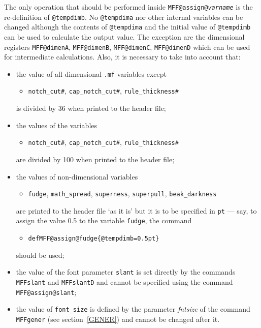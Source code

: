 The only operation that should be performed inside
{\tt\bs{}MFF@assign@{\em varname}} is the re-definition of
{\tt\bs{}@tempdimb}. No {\tt\bs{}@tempdima} nor other
internal variables can be changed although the contents of
{\tt\bs{}@tempdima} and the initial value of {\tt\bs{}@tempdimb}
can be used to calculate the output value. The exception are
the dimensional registers
{\tt\bs{}MFF@dimenA}, {\tt\bs{}MFF@dimenB},
{\tt\bs{}MFF@dimenC}, {\tt\bs{}MFF@dimenD}
which can be used for intermediate calculations.
Also, it is necessary to take into account that:
\begin{itemize}
\item the value of all dimensional {\tt .mf} variables except
      \begin{itemize}\item[]
      {\tt notch\_cut\#}, {\tt cap\_notch\_cut\#},
      {\tt rule\_thickness\#}
      \end{itemize}
      is divided by 36 when printed to the header file;
\item the values of the variables
      \begin{itemize}\item[]
      {\tt notch\_cut\#}, {\tt cap\_notch\_cut\#},
      {\tt rule\_thickness\#}
      \end{itemize}
      are divided by 100 when printed to the header file;
\item the values of non-dimensional variables
      \begin{itemize}
      \item[]\begin{flushleft}
      {\tt fudge}, {\tt math\_spread},
      {\tt superness}, {\tt superpull},
      {\tt beak\_darkness}
      \end{flushleft}\end{itemize}
      are printed to the header file `as it is' but it is to be
      specified in {\tt pt} --- say, to assign
      the value 0.5 to the variable {\tt fudge},
      the command
      \begin{itemize}
      \item[] {\tt \bs{}def\bs{}MFF@assign@fudge\{\bs{}@tempdimb=0.5pt\}}
      \end{itemize}
      should be used;
\item the value of the font parameter {\tt slant} is
      set directly by the commands {\tt \bs{}MFFslant}
      and {\tt \bs{}MFFslantD} and cannot be specified
      using the command {\tt\bs{}MFF@assign@slant};
\item the value of {\tt font\_size} is defined by the parameter
      {\em fntsize} of the command {\tt\bs{}MFFgener}
      (see section~\ref{GENER}) and cannot be changed
      after it.
\end{itemize}


